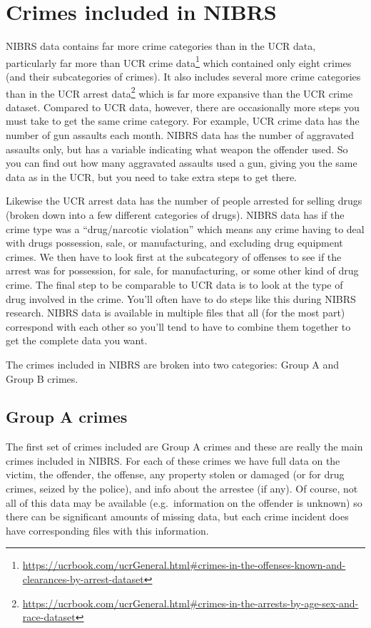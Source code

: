 \documentclass[
]{krantz}
\renewcommand{\href}[2]{#2\footnote{\url{#1}}}
\begin{document}
\section{Crimes included in
NIBRS}\label{crimes-included-in-nibrs}

NIBRS data contains far more crime categories than in the
UCR data, particularly far more than
\href{https://ucrbook.com/ucrGeneral.html\#crimes-in-the-offenses-known-and-clearances-by-arrest-dataset}{UCR
crime data} which contained only eight crimes (and their
subcategories of crimes). It also includes several more
crime categories than in the
\href{https://ucrbook.com/ucrGeneral.html\#crimes-in-the-arrests-by-age-sex-and-race-dataset}{UCR
arrest data} which is far more expansive than the UCR crime
dataset. Compared to UCR data, however, there are
occasionally more steps you must take to get the same crime
category. For example, UCR crime data has the number of gun
assaults each month. NIBRS data has the number of aggravated
assaults only, but has a variable indicating what weapon the
offender used. So you can find out how many aggravated
assaults used a gun, giving you the same data as in the UCR,
but you need to take extra steps to get there.

Likewise the UCR arrest data has the number of people
arrested for selling drugs (broken down into a few different
categories of drugs). NIBRS data has if the crime type was a
``drug/narcotic violation'' which means any crime having to
deal with drugs possession, sale, or manufacturing, and
excluding drug equipment crimes. We then have to look first
at the subcategory of offenses to see if the arrest was for
possession, for sale, for manufacturing, or some other kind
of drug crime. The final step to be comparable to UCR data
is to look at the type of drug involved in the crime. You'll
often have to do steps like this during NIBRS research.
NIBRS data is available in multiple files that all (for the
most part) correspond with each other so you'll tend to have
to combine them together to get the complete data you want.

The crimes included in NIBRS are broken into two categories:
Group A and Group B crimes.

\subsection{Group A crimes}\label{group-a-crimes}

The first set of crimes included are Group A crimes and
these are really the main crimes included in NIBRS. For each
of these crimes we have full data on the victim, the
offender, the offense, any property stolen or damaged (or
for drug crimes, seized by the police), and info about the
arrestee (if any). Of course, not all of this data may be
available (e.g.~information on the offender is unknown) so
there can be significant amounts of missing data, but each
crime incident does have corresponding files with this
information.
\end{document}
